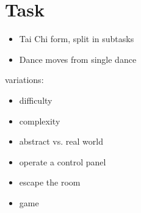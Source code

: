 \section{Task}
	\begin{itemize}
		\item Tai Chi form, split in subtasks
		\item Dance moves from single dance
	\end{itemize}
variations:
\begin{itemize}
	\item difficulty
	\item complexity
	\item abstract vs. real world
	\item operate a control panel
	\item escape the room
	\item game	
\end{itemize}
